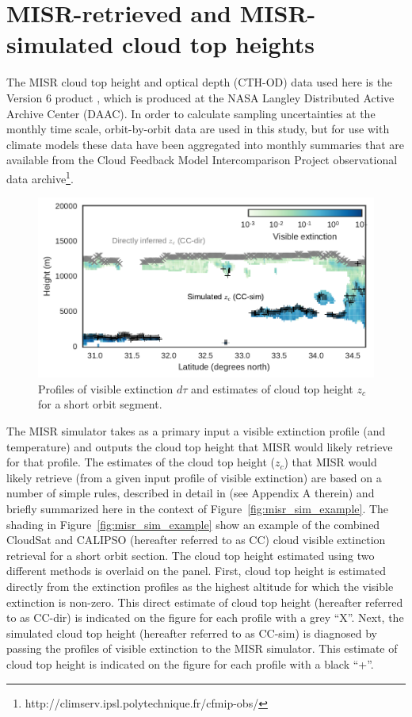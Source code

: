 \section{MISR-retrieved and MISR-simulated cloud top
heights}\label{sec:misrRetrievals}

The MISR cloud top height and optical depth (CTH-OD) data used here is
the Version 6 product \citep{marchand_et_al_2010}, which is produced at
the NASA Langley Distributed Active Archive Center (DAAC). In order to
calculate sampling uncertainties at the monthly time scale,
orbit-by-orbit data are used in this study, but for use with climate
models these data have been aggregated into monthly summaries that are
available from the Cloud Feedback Model Intercomparison Project
\citep[CFMIP;][]{webb_et_al_2016} observational data archive\footnote{http://climserv.ipsl.polytechnique.fr/cfmip-obs/}.

\begin{figure}[htbp]
\centering
\includegraphics{graphics/misr_sim_example.pdf}
\caption{\label{fig:misr_sim_example}Profiles of visible extinction
\(d\tau\) and estimates of cloud top height \(z_c\) for a short orbit
segment.}\label{fig:misrux5fsimux5fexample}
\end{figure}

The MISR simulator takes as a primary input a visible extinction profile
(and temperature) and outputs the cloud top height that MISR would
likely retrieve for that profile. The estimates of the cloud top height
(\(z_c\)) that MISR would likely retrieve (from a given input profile of
visible extinction) are based on a number of simple rules, described in
detail in \citet{marchand_and_ackerman_2010} (see Appendix A therein)
and briefly summarized here in the context of
Figure~\ref{fig:misr_sim_example}. The shading in
Figure~\ref{fig:misr_sim_example} show an example of the combined
CloudSat and CALIPSO (hereafter referred to as CC) cloud visible
extinction retrieval for a short orbit section. The cloud top height
estimated using two different methods is overlaid on the panel. First,
cloud top height is estimated directly from the extinction profiles as
the highest altitude for which the visible extinction is non-zero. This
direct estimate of cloud top height (hereafter referred to as CC-dir) is
indicated on the figure for each profile with a grey ``X''. Next, the
simulated cloud top height (hereafter referred to as CC-sim) is
diagnosed by passing the profiles of visible extinction to the MISR
simulator. This estimate of cloud top height is indicated on the figure
for each profile with a black ``+''.

